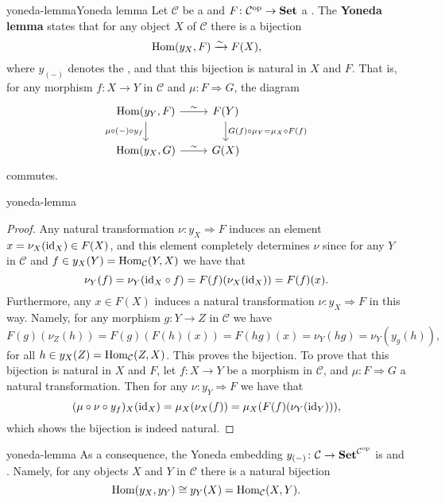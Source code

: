 \begin{topic}{yoneda-lemma}{Yoneda lemma}
    Let $\mathcal{C}$ be a  and $F \colon \mathcal{C}^\textup{op} \to \textbf{Set}$ a . The \textbf{Yoneda lemma} states that for any object $X$ of $\mathcal{C}$ there is a bijection
    \[ \operatorname{Hom}(y_X, F) \xrightarrow{\sim} F(X) , \]
    where $y_{(-)}$ denotes the , and that this bijection is natural in $X$ and $F$. That is, for any morphism $f \colon X \to Y$ in $\mathcal{C}$ and  $\mu : F \Rightarrow G$, the diagram
    \[ \svg \begin{tikzcd} \Hom(y_Y, F) \arrow{r}{\sim} \arrow[swap]{d}{\mu \circ (-) \circ y_f} & F(Y) \arrow{d}{G(f) \circ \mu_Y = \mu_X \circ F(f)} \\ \Hom(y_X, G) \arrow{r}{\sim} & G(X) \end{tikzcd} \]
    commutes.
\end{topic}

\begin{example}{yoneda-lemma}
    \begin{proof}
        Any natural transformation $\nu : y_X \Rightarrow F$ induces an element $x = \nu_X(\textup{id}_X) \in F(X)$, and this element completely determines $\nu$ since for any $Y$ in $\mathcal{C}$ and $f \in y_X(Y) = \operatorname{Hom}_\mathcal{C}(Y, X)$ we have that
        \[ \nu_{Y}(f) = \nu_{Y}(\textup{id}_X \circ f) = F(f)(\nu_X(\textup{id}_X)) = F(f)(x) . \]
        Furthermore, any $x \in F(X)$ induces a natural transformation $\nu \colon y_X \Rightarrow F$ in this way. Namely, for any morphism $g \colon Y \to Z$ in $\mathcal{C}$ we have
        \[ F(g)(\nu_Z(h)) = F(g)(F(h)(x)) = F(hg)(x) = \nu_Y(hg) = \nu_Y(y_g(h)) , \]
        for all $h \in y_X(Z) = \operatorname{Hom}_\mathcal{C}(Z, X)$. This proves the bijection. To prove that this bijection is natural in $X$ and $F$, let $f \colon X \to Y$ be a morphism in $\mathcal{C}$, and $\mu : F \Rightarrow G$ a natural transformation. Then for any $\nu : y_Y \Rightarrow F$ we have that
        \[ (\mu \circ \nu \circ y_f)_X(\textup{id}_X) = \mu_X(\nu_X(f)) = \mu_X(F(f)(\nu_Y(\textup{id}_Y))) , \]
        which shows the bijection is indeed natural.
    \end{proof}
\end{example}

\begin{example}{yoneda-lemma}
    As a consequence, the Yoneda embedding $y_{(-)} \colon \mathcal{C} \to \textbf{Set}^{\mathcal{C}^\textup{op}}$ is  and . Namely, for any objects $X$ and $Y$ in $\mathcal{C}$ there is a natural bijection
    \[ \operatorname{Hom}(y_X, y_Y) \cong y_Y(X) = \operatorname{Hom}_\mathcal{C}(X, Y) . \]
\end{example}

